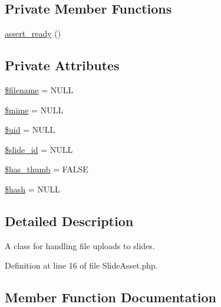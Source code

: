 \subsection*{Private Member Functions}
\begin{DoxyCompactItemize}
\item 
\hyperlink{classlibresignage_1_1common_1_1php_1_1slide_1_1SlideAsset_a0a4b66cbfb623dd2ed2afed1ae95a8a1}{assert\+\_\+ready} ()
\end{DoxyCompactItemize}
\subsection*{Private Attributes}
\begin{DoxyCompactItemize}
\item 
\hyperlink{classlibresignage_1_1common_1_1php_1_1slide_1_1SlideAsset_a8f4f8c3fac02f12c76978d4553f743aa}{\$filename} = N\+U\+LL
\item 
\hyperlink{classlibresignage_1_1common_1_1php_1_1slide_1_1SlideAsset_ad94f76b63fc0b698c769defc9be71b0e}{\$mime} = N\+U\+LL
\item 
\hyperlink{classlibresignage_1_1common_1_1php_1_1slide_1_1SlideAsset_a27474835be783826324c65fbb4dbad58}{\$uid} = N\+U\+LL
\item 
\hyperlink{classlibresignage_1_1common_1_1php_1_1slide_1_1SlideAsset_ae9addf6e50f51007d880ed032ed76f38}{\$slide\+\_\+id} = N\+U\+LL
\item 
\hyperlink{classlibresignage_1_1common_1_1php_1_1slide_1_1SlideAsset_ad3ea8ba26b0a0a7c33b877f0eab2c0cb}{\$has\+\_\+thumb} = F\+A\+L\+SE
\item 
\hyperlink{classlibresignage_1_1common_1_1php_1_1slide_1_1SlideAsset_adce96e81bd0c4b4d91a9fdd8bd244282}{\$hash} = N\+U\+LL
\end{DoxyCompactItemize}


\subsection{Detailed Description}
A class for handling file uploads to slides. 

Definition at line 16 of file Slide\+Asset.\+php.



\subsection{Member Function Documentation}
\mbox{\label{classlibresignage_1_1common_1_1php_1_1slide_1_1SlideAsset_a6958ef41826cf6f250206cf07b3051d0}} 
